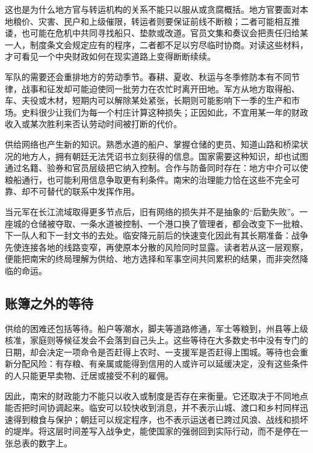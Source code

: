 这也是为什么地方官与转运机构的关系不能只以服从或贪腐概括。地方官要面对本地粮价、灾害、民户和上级催限，转运者则要保证前线不断粮；二者可能相互推诿，也可能在危机中共同寻找船只、垫款或改道。官员文集和奏议会把责任归给某一人，制度条文会规定应有的程序，二者都不足以穷尽临时协商。对读这些材料，才可看见一个中央财政如何在现实道路上变得断断续续。

军队的需要还会重排地方的劳动季节。春耕、夏收、秋运与冬季修防本有不同节律，战事和征发却可能迫使同一批劳力在农忙时离开田地。军方从地方取得船、车、夫役或木材，短期内可以解除某处紧张，长期则可能影响下一季的生产和市场。史料很少让我们为每一个村庄计算这种损失；正因如此，不宜用某一年的财政收入或某次胜利来否认劳动时间被打断的代价。

供给网络也产生新的知识。熟悉水道的船户、掌握仓储的吏员、知道山路和桥梁状况的地方人，拥有朝廷无法凭诏书立刻获得的信息。国家需要这种知识，却也试图通过名籍、验券和官员层级把它纳入控制。合作与防备同时存在：地方中介可以使粮船通行，也可能利用信息争取更有利条件。南宋的治理能力恰在这些不完全可靠、却不可替代的联系中发挥作用。

当元军在长江流域取得更多节点后，旧有网络的损失并不是抽象的“后勤失败”。一座城的仓储被夺取、一条水道被控制、一个港口换了管理者，都会改变下一批粮、下一队人和下一封文书的去处。临安降元前后的快速变化因此有其长期准备：战争先使连接各地的线路变窄，再使原本分散的风险同时显露。读者若从这一层观察，便能把南宋的终局理解为供给、地方选择和军事空间共同累积的结果，而非突然降临的命运。

\subsection{账簿之外的等待}

供给的困难还包括等待。船户等潮水，脚夫等道路修通，军士等粮到，州县等上级核准，家庭则等候征发会不会落到自己头上。这些等待在大多数史书中没有专门的日期，却会决定一项命令是否赶得上农时、一支援军是否赶得上围城。等待也会重新分配风险：有存粮、有亲属或能得到信用的人或许可以延缓决定，没有这些条件的人只能更早卖物、迁居或接受不利的雇佣。

因此，南宋的财政能力不能只以收入或制度是否存在来衡量。它还取决于不同地点能否把时间协调起来。临安可以较快收到消息，并不表示山城、渡口和乡村同样迅速得到粮食与保护；朝廷可以规定程序，也不表示运送者已跨过风浪、战线和损坏的堤岸。将这层时间差写入战争史，能使国家的强弱回到实际行动，而不是停在一张总表的数字上。
